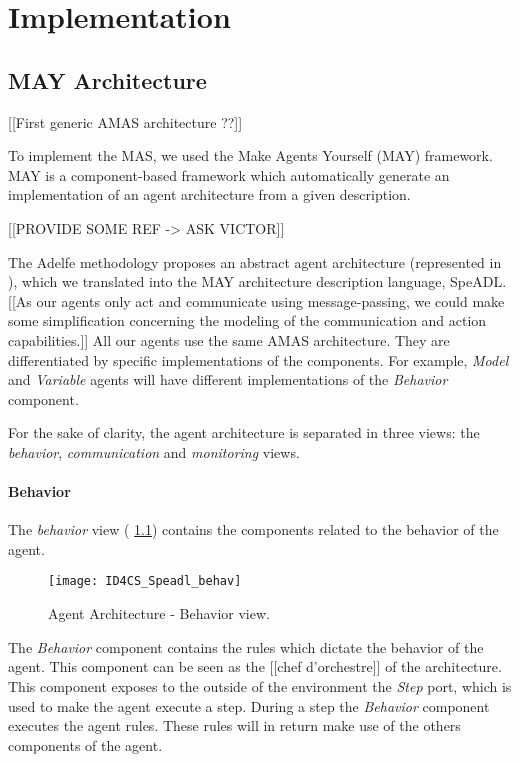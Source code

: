 \part{Implementation}

\chapter{MAY Architecture}

[[First generic AMAS architecture ??]]

To implement the MAS, we used the Make Agents Yourself (MAY) framework. MAY is a component-based framework which automatically generate an implementation of an agent architecture from a given description.

[[PROVIDE SOME REF -> ASK VICTOR]]

The Adelfe methodology proposes an abstract agent architecture (represented in \fig{[[TODO]]}), which we translated into the MAY architecture description language, SpeADL. [[As our agents only act and communicate using message-passing, we could make some simplification concerning the modeling of the communication and action capabilities.]]
All our agents use the same AMAS architecture. They are differentiated by specific implementations of the components. For example, \emph{Model} and \emph{Variable} agents will have different implementations of the \emph{Behavior} component.

For the sake of clarity, the agent architecture is separated in three views: the \emph{behavior}, \emph{communication} and \emph{monitoring} views.

\subsection{Behavior}

The \emph{behavior} view (\figurename{} \ref{Arch-behavior}) contains the components related to the behavior of the agent. 

\begin{figure}
\centering
\texttt{[image: ID4CS\_Speadl\_behav]}
\caption{Agent Architecture - Behavior view.}
\label{Arch-behavior}
\end{figure}

The \emph{Behavior} component contains the rules which dictate the behavior of the agent. This component can be seen as the [[chef d'orchestre]] of the architecture. This component exposes to the outside of the environment the \emph{Step} port, which is used to make the agent execute a step. During a step the \emph{Behavior} component executes the agent rules. These rules will in return make use of the others components of the agent.

